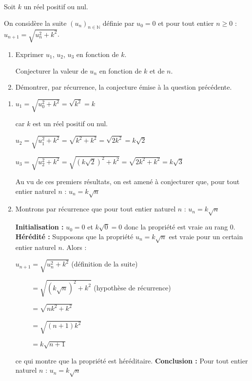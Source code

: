 
%
Soit $k$ un réel positif ou nul.
\par
On considère la suite $(u_n)_{n \in \mathbb{N}}$ définie  par $u_0=0$ et pour tout entier $n \geqslant 0$ : $u_{n+1}= \sqrt{u_n^2+k^2} $.
\begin{enumerate}
     \item
     Exprimer $u_1$, $u_2$, $u_3$ en fonction de $k$.
     \par
     Conjecturer la valeur de $u_n$ en fonction de $k$ et de $n$.
     \item
     Démontrer, par récurrence, la conjecture émise à la question précédente.
\end{enumerate}
\begin{corrige}
     \begin{enumerate}
          \item
          $u_{1}= \sqrt{u_0^2+k^2}$$ = \sqrt{k^2} = k $
          \par
          car $k$ est un réel positif ou nul.
          \par
          $u_{2}= \sqrt{u_1^2+k^2} = \sqrt{k^2 + k^2}$$= \sqrt{2k^2} = k\sqrt{2} $
          \par
          $u_{3}= \sqrt{u_2^2+k^2} = \sqrt{\left(k\sqrt{2}\right)^2 + k^2}= \sqrt{2k^2+k^2} = k\sqrt{3} $
          \par
          Au vu de ces premiers résultats, on est amené à conjecturer que, pour tout entier naturel $n$ : $u_n=k \sqrt{n} $
          \item
          Montrons par récurrence que pour tout entier naturel $n$ : $u_n=k \sqrt{n} $
\par
          \textbf{Initialisation :}
          $u_0=0$ et $k \sqrt{0} = 0 $ donc la propriété est vraie au rang $0$.
          \textbf{Hérédité :}
          Supposons que la propriété $u_n=k \sqrt{n} $ est vraie pour un certain entier naturel $n$. Alors :
          \par
          $u_{n+1}= \sqrt{u_n^2+k^2} $ (définition de la suite)
          \par
          $\phantom{u_{n+1}}= \sqrt{\left(k \sqrt{n}\right)^2+k^2} $ (hypothèse de récurrence)
          \par
          $\phantom{u_{n+1}}= \sqrt{nk^2+k^2} $
          \par
          $\phantom{u_{n+1}}= \sqrt{(n+1)k^2} $
          \par
          $\phantom{u_{n+1}}= k\sqrt{n+1} $
          \par
          ce qui montre que la propriété est héréditaire.
          \textbf{Conclusion :}
          Pour tout entier naturel $n$ : $u_n=k \sqrt{n} $
     \end{enumerate}
\end{corrige}
